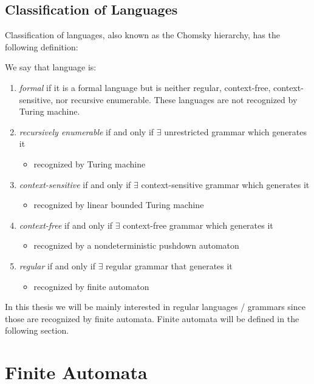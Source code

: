 \subsection{Classification of Languages}
Classification of languages, also known as the Chomsky hierarchy, has the following definition:
\begin{definition}
    We say that language is:
\end{definition}
\begin{enumerate}
    \item \textit{formal} if it is a formal language but is neither regular, context-free, context-sensitive, nor recursive enumerable. These languages are not recognized by Turing machine.
    \item \textit{recursively enumerable} if and only if $\exists$ unrestricted grammar which generates it
    \begin{itemize}
        \item recognized by Turing machine
    \end{itemize}
    \item \textit{context-sensitive} if and only if $\exists$ context-sensitive grammar which generates it
    \begin{itemize}
        \item recognized by linear bounded Turing machine
    \end{itemize}
    \item \textit{context-free} if and only if $\exists$ context-free grammar which generates it
    \begin{itemize}
        \item recognized by a nondeterministic pushdown automaton
    \end{itemize}
    \item \textit{regular} if and only if $\exists$ regular grammar that generates it
    \begin{itemize}
        \item recognized by finite automaton
    \end{itemize}
\end{enumerate}

In this thesis we will be mainly interested in regular languages / grammars since those are recognized by finite automata. Finite automata will be defined in the following section.

\section{Finite Automata}

